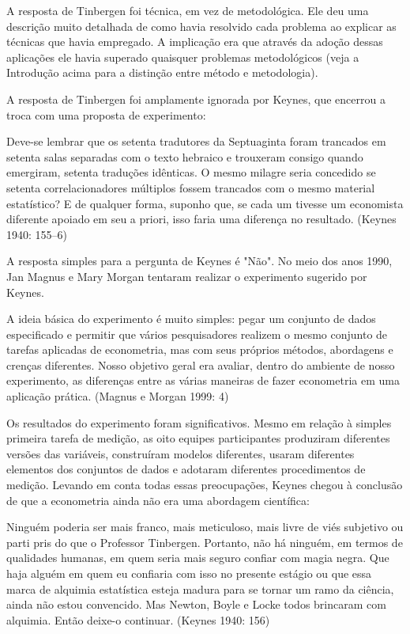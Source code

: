 \documentclass[12pt]{article}
\begin{document}
A resposta de Tinbergen foi técnica, em vez de metodológica. Ele
deu uma descrição muito detalhada de como havia resolvido cada problema ao
explicar as técnicas que havia empregado. A implicação era que
através da adoção dessas aplicações ele havia superado quaisquer problemas metodológicos (veja a Introdução acima para a distinção entre
método e metodologia).

A resposta de Tinbergen foi amplamente ignorada por Keynes, que encerrou a
troca com uma proposta de experimento:

Deve-se lembrar que os setenta tradutores da Septuaginta foram
trancados em setenta salas separadas com o texto hebraico e trouxeram consigo
quando emergiram, setenta traduções idênticas. O mesmo milagre seria concedido se setenta correlacionadores múltiplos fossem
trancados com o mesmo material estatístico? E de qualquer forma, suponho que, se
cada um tivesse um economista diferente apoiado em seu a priori, isso faria
uma diferença no resultado.
(Keynes 1940: 155–6)

A resposta simples para a pergunta de Keynes é "Não". No meio dos
anos 1990, Jan Magnus e Mary Morgan tentaram realizar o experimento sugerido por Keynes.

A ideia básica do experimento é muito simples: pegar um conjunto de dados especificado
e permitir que vários pesquisadores realizem o mesmo conjunto de tarefas aplicadas
de econometria, mas com seus próprios métodos, abordagens
e crenças diferentes. Nosso objetivo geral era avaliar, dentro do ambiente de
nosso experimento, as diferenças entre as várias maneiras de fazer
econometria em uma aplicação prática.
(Magnus e Morgan 1999: 4)

Os resultados do experimento foram significativos. Mesmo em relação à simples
primeira tarefa de medição, as oito equipes participantes produziram diferentes
versões das variáveis, construíram modelos diferentes, usaram diferentes elementos
dos conjuntos de dados e adotaram diferentes procedimentos de medição.
Levando em conta todas essas preocupações, Keynes chegou à conclusão
de que a econometria ainda não era uma abordagem científica:

Ninguém poderia ser mais franco, mais meticuloso, mais livre de viés subjetivo
ou parti pris do que o Professor Tinbergen. Portanto, não há ninguém,
em termos de qualidades humanas, em quem seria mais seguro confiar
com magia negra. Que haja alguém em quem eu confiaria com isso no presente
estágio ou que essa marca de alquimia estatística esteja madura para se tornar
um ramo da ciência, ainda não estou convencido. Mas Newton, Boyle e
Locke todos brincaram com alquimia. Então deixe-o continuar.
(Keynes 1940: 156)
\end{document}
